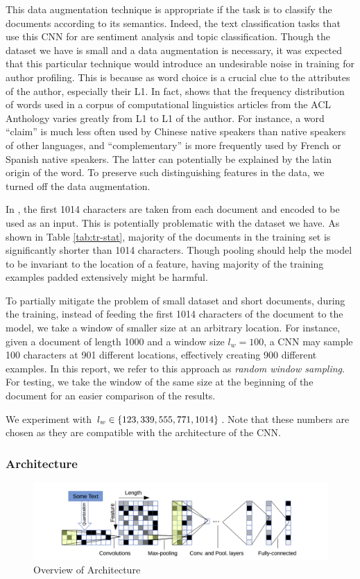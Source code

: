 This data augmentation technique is appropriate if the task is to classify the documents according to its semantics.
Indeed, the text classification tasks that \cite{zhang2015character} use this CNN for are sentiment analysis and topic classification.
Though the dataset we have is small and a data augmentation is necessary, it was expected that this particular technique would introduce an undesirable noise in training for author profiling. This is because as word choice is a crucial clue to the attributes of the author, especially their L1.
In fact, \cite{yarowsky2013learning} shows that the frequency distribution of words used in a corpus of computational linguistics articles from the ACL Anthology varies greatly from L1 to L1 of the author.
For instance, a word ``claim'' is much less often used by Chinese native speakers than native speakers of other languages, and ``complementary'' is more frequently used by French or Spanish native speakers.
The latter can potentially be explained by the latin origin of the word.
To preserve such distinguishing features in the data, we turned off the data augmentation.

In \citep{zhang2015character}, the first 1014 characters are taken from each document and encoded to be used as an input.
This is potentially problematic with the dataset we have.
As shown in Table \ref{tab:tr-stat}, majority of the documents in the training set is significantly shorter than 1014 characters.
Though pooling should help the model to be invariant to the location of a feature, having majority of the training examples padded extensively might be harmful.

To partially mitigate the problem of small dataset and short documents, during the training, instead of feeding the first 1014 characters of the document to the model, we take a window of smaller size at an arbitrary location.
For instance, given a document of length 1000 and a window size $l_w = 100$, a CNN may sample 100 characters at 901 different locations, effectively creating 900 different examples.
In this report, we refer to this approach as \emph{random window sampling}.
For testing, we take the window of the same size at the beginning of the document for an easier comparison of the results.

We experiment with $l_w \in \{123, 339, 555, 771, \\1014\}$.
Note that these numbers are chosen as they are compatible with the architecture of the CNN.
\subsubsection{Architecture}
\begin{figure}[h]
\includegraphics[width=\textwidth]{architecture.png}
\caption{Overview of Architecture}
\label{fig:architecture}
\end{figure}

